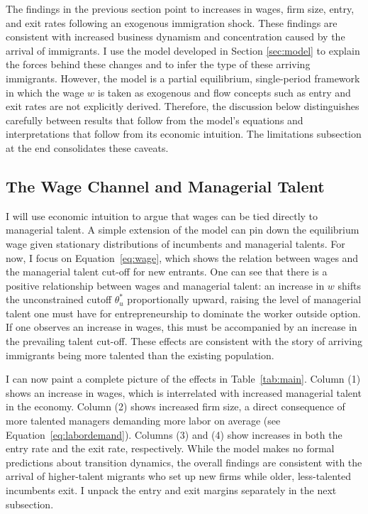 
    The findings in the previous section point to increases in wages, firm size, entry, and exit rates following an exogenous immigration shock. These findings are consistent with increased business dynamism and concentration caused by the arrival of immigrants. I use the model developed in Section \ref{sec:model} to explain the forces behind these changes and to infer the type of these arriving immigrants. However, the model is a partial equilibrium, single-period framework in which the wage $w$ is taken as exogenous and flow concepts such as entry and exit rates are not explicitly derived. Therefore, the discussion below distinguishes carefully between results that follow from the model's equations and interpretations that follow from its economic intuition. The limitations subsection at the end consolidates these caveats.

\subsection{The Wage Channel and Managerial Talent}


    I will use economic intuition to argue that wages can be tied directly to managerial talent. A simple extension of the model can pin down the equilibrium wage given stationary distributions of incumbents and managerial talents. For now, I focus on Equation~\eqref{eq:wage}, which shows the relation between wages and the managerial talent cut-off for new entrants. One can see that there is a positive relationship between wages and managerial talent: an increase in $w$ shifts the unconstrained cutoff $\theta^{*}_{u}$ proportionally upward, raising the level of managerial talent one must have for entrepreneurship to dominate the worker outside option. If one observes an increase in wages, this must be accompanied by an increase in the prevailing talent cut-off. These effects are consistent with the story of arriving immigrants being more talented than the existing population.

    I can now paint a complete picture of the effects in Table~\ref{tab:main}. Column (1) shows an increase in wages, which is interrelated with increased managerial talent in the economy. Column (2) shows increased firm size, a direct consequence of more talented managers demanding more labor on
    average (see Equation~\eqref{eq:labordemand}). Columns (3) and (4) show increases in both the entry rate and the exit rate, respectively. While the model makes no formal predictions about transition dynamics, the overall findings are consistent with the arrival of higher-talent migrants who set up new firms while older, less-talented incumbents exit. I unpack the entry and exit margins separately in the next subsection.

